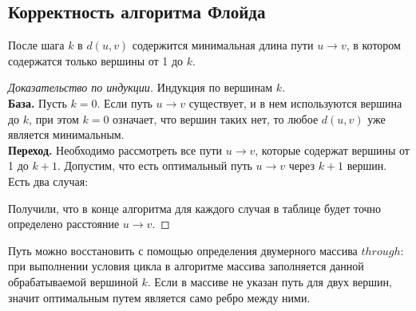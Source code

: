 \documentclass[russian]{lecture-notes}
\newenvironment{centeredgraph}[3]
{
	\begin{center}
		\begin{tikzpicture}[every node/.style={#1}, every edge/.style={#2}, every path/.style={#3}]
	}
	{
		\end{tikzpicture}
	\end{center}
}
\begin{document}
	\subsection{Корректность алгоритма Флойда}
	\begin{proposition}
		После шага $k$ в $d(u,v)$ содержится минимальная длина пути $u \to v$, в котором содержатся только вершины от 1 до $k$.
	\end{proposition}
	\begin{proof}[Доказательство по индукции]
		Индукция по вершинам $k$.\\
		\textbf{База.} Пусть $k = 0$. Если путь $u \to v$ существует, и в нем используются вершина до $k$, при этом $k = 0$ означает, что вершин таких нет, то любое $d(u,v)$ уже является минимальным.\\
		\textbf{Переход.} Необходимо рассмотреть все пути $u \to v$, которые содержат вершины от 1 до $k + 1$. Допустим, что есть оптимальный путь $u \to v$ через $k+1$ вершин. Есть два случая:
		Получили, что в конце алгоритма для каждого случая в таблице будет точно определено расстояние $u \to v$.
	\end{proof}
	\begin{remark}
		Путь можно восстановить с помощью определения двумерного массива $through$: при выполнении условия цикла в алгоритме массива заполняется данной обрабатываемой вершиной $k$. Если в массиве не указан путь для двух вершин, значит оптимальным путем является само ребро между ними.
	\end{remark}
	
\end{document}
